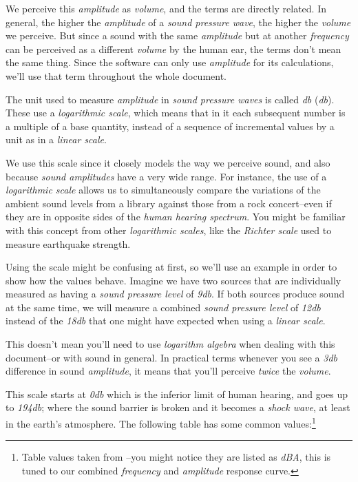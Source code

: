 \documentclass[10pt,a4paper]{report}
\newcommand{\define}[1]{\textit{\acrlong{#1}} (\textit{\acrshort{#1}})}
\newcommand{\dbSPL}[1]{\textit{\mbox{#1\acrshort{db}}}}
\begin{document}
We perceive this \textit{amplitude} as \textit{volume}, and the terms are directly related. In general, the higher the \textit{amplitude} of a \textit{sound pressure wave}, the higher the \textit{volume} we perceive. But since a sound with the same  \textit{amplitude} but at another \textit{frequency} can be perceived as a different \textit{volume} by the human ear, the terms don't mean the same thing. Since the software can only use \textit{amplitude} for its calculations, we'll use that term throughout the whole document.

The unit used to measure \textit{amplitude} in \textit{sound pressure waves} is called \define{db}. These use a \textit{logarithmic scale}, which means that in it each subsequent number is a multiple of a base quantity, instead of a sequence of incremental values by a unit as in a \textit{linear scale}. 

We use this scale since it closely models the way we perceive sound, and also because \textit{sound amplitudes} have a very wide range. For instance, the use of a \textit{logarithmic scale} allows us to simultaneously compare the variations of the ambient sound levels from a library against those from a rock concert--even if they are in opposite sides of the \textit{human hearing spectrum}. You might be familiar with this concept from other \textit{logarithmic scales}, like the \textit{Richter scale} used to measure earthquake strength.

Using the scale might be confusing at first, so we'll use an example in order to show how the values behave. Imagine we have two sources that are individually measured as having a \textit{sound pressure level} of \dbSPL{9}. If both sources produce sound at the same time, we will measure a combined \textit{sound pressure level} of \dbSPL{12} instead of the \dbSPL{18} that one might have expected when using a \textit{linear scale}. 

This doesn't mean you'll need to use \textit{logarithm algebra} when dealing with this document--or with sound in general. In practical terms whenever you see a \dbSPL{3} difference in sound \textit{amplitude}, it means that you'll perceive \textit{twice} the \textit{volume}.

\newpage
This scale starts at \dbSPL{0} which is the inferior limit of human hearing, and goes up to \dbSPL{194}; where the sound barrier is broken and it becomes a \textit{shock wave}, at least in the earth's atmosphere. The following table has some common values:\footnote{Table values taken from \cite{noiselevels}--you might notice they are listed as \textit{dBA}, this is tuned to our combined \textit{frequency} and \textit{amplitude} response curve.}
\end{document}
